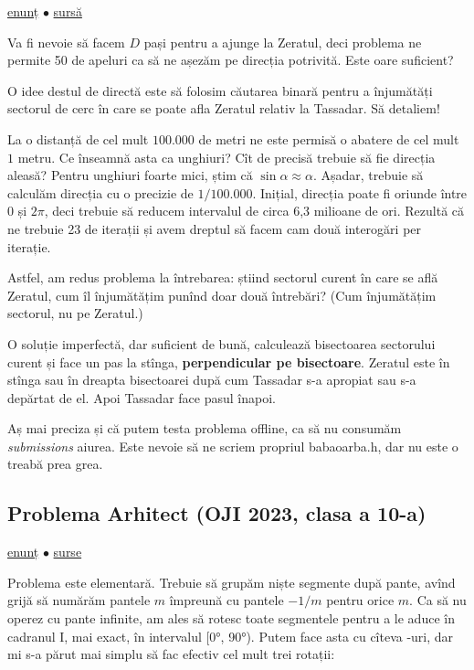 \documentclass[../main.tex]{subfiles}
\begin{document}
\href{https://kilonova.ro/problems/1916}{enunț}
$\bullet$
\hyperref[code:babaoarba]{sursă}

Va fi nevoie să facem $D$ pași pentru a ajunge la Zeratul, deci problema ne permite 50 de apeluri ca să ne așezăm pe direcția potrivită. Este oare suficient?

O idee destul de directă este să folosim căutarea binară pentru a înjumătăți sectorul de cerc în care se poate afla Zeratul relativ la Tassadar. Să detaliem!

La o distanță de cel mult $100.000$ de metri ne este permisă o abatere de cel mult $1$ metru. Ce înseamnă asta ca unghiuri? Cît de precisă trebuie să fie direcția aleasă? Pentru unghiuri foarte mici, știm că $\sin \alpha \approx \alpha$. Așadar, trebuie să calculăm direcția cu o precizie de $1 / 100.000$. Inițial, direcția poate fi oriunde între $0$ și $2 \pi$, deci trebuie să reducem intervalul de circa 6,3 milioane de ori. Rezultă că ne trebuie 23 de iterații și avem dreptul să facem cam două interogări per iterație.

Astfel, am redus problema la întrebarea: știind sectorul curent în care se află Zeratul, cum îl înjumătățim punînd doar două întrebări?  (Cum înjumătățim sectorul, nu pe Zeratul.)

O soluție imperfectă, dar suficient de bună, calculează bisectoarea sectorului curent și face un pas la stînga, \textbf{perpendicular pe bisectoare}. Zeratul este în stînga sau în dreapta bisectoarei după cum Tassadar s-a apropiat sau s-a depărtat de el. Apoi Tassadar face pasul înapoi.

Aș mai preciza și că putem testa problema offline, ca să nu consumăm \textit{submissions} aiurea. Este nevoie să ne scriem propriul babaoarba.h, dar nu este o treabă prea grea.

\subsection{Problema Arhitect (OJI 2023, clasa a 10-a)}
\label{problem:arhitect}

\href{https://kilonova.ro/problems/504}{enunț}
$\bullet$
\hyperref[code:arhitect]{surse}

Problema este elementară. Trebuie să grupăm niște segmente după pante, avînd grijă să numărăm pantele $m$ împreună cu pantele $-1/m$ pentru orice $m$. Ca să nu operez cu pante infinite, am ales să rotesc toate segmentele pentru a le aduce în cadranul I, mai exact, în intervalul [0°, 90°). Putem face asta cu cîteva -uri, dar mi s-a părut mai simplu să fac efectiv cel mult trei rotații:
\end{document}
